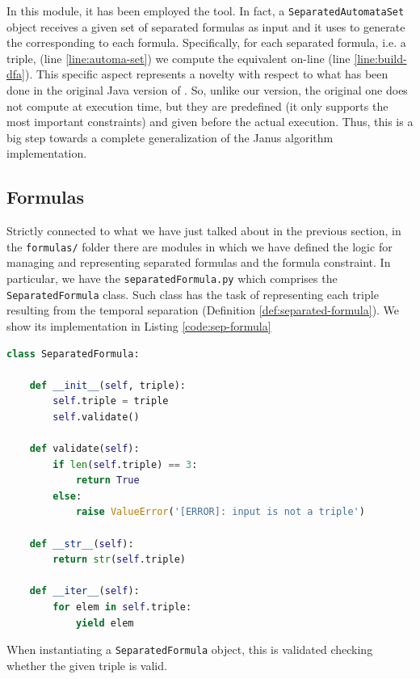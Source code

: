 In this module, it has been employed the \LTLfToDFA tool. In fact, a \texttt{SeparatedAutomataSet} object receives a given set of separated formulas as input and it uses \LTLfToDFA to generate the \DFA corresponding to each formula. Specifically, for each separated formula, i.e. a triple, (line \ref{line:automa-set}) we compute the equivalent \DFA on-line (line \ref{line:build-dfa}). This specific aspect represents a novelty with respect to what has been done in the original Java version of \janus. So, unlike our \janus version, the original one does not compute  \DFAs at execution time, but they are predefined (it only supports the most important \declare constraints) and given before the actual execution. Thus, this is a big step towards a complete generalization of the Janus algorithm implementation.
\subsection{Formulas}
Strictly connected to what we have just talked about in the previous section, in the \texttt{formulas/} folder there are modules in which we have defined the logic for managing and representing separated formulas and the formula constraint. In particular, we have the \texttt{separatedFormula.py} which comprises the \texttt{SeparatedFormula} class. Such class has the task of representing each triple resulting from the temporal separation (Definition \ref{def:separated-formula}). We show its implementation in Listing \ref{code:sep-formula}
\begin{lstlisting}[language=Python, style=Python, escapechar = £, label={code:sep-formula}, caption={The \texttt{separatedFormula.py} module}]
class SeparatedFormula:

    def __init__(self, triple):
        self.triple = triple
        self.validate()

    def validate(self):
        if len(self.triple) == 3:
            return True
        else:
            raise ValueError('[ERROR]: input is not a triple')

    def __str__(self):
        return str(self.triple)

    def __iter__(self):
        for elem in self.triple:
            yield elem
\end{lstlisting}
When instantiating a \texttt{SeparatedFormula} object, this is validated checking whether the given triple is valid.  

